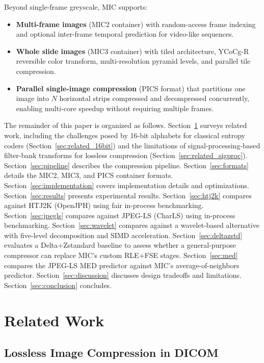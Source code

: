 \documentclass[11pt,twocolumn]{article}
\begin{document}
Beyond single-frame greyscale, MIC supports:
\begin{itemize}[nosep]
    \item \textbf{Multi-frame images} (MIC2 container) with random-access frame indexing and optional inter-frame temporal prediction for video-like sequences.
    \item \textbf{Whole slide images} (MIC3 container) with tiled architecture, YCoCg-R reversible color transform, multi-resolution pyramid levels, and parallel tile compression.
    \item \textbf{Parallel single-image compression} (PICS format) that partitions one image into $N$ horizontal strips compressed and decompressed concurrently, enabling multi-core speedup without requiring multiple frames.
\end{itemize}

The remainder of this paper is organized as follows.
Section~\ref{sec:related} surveys related work, including the challenges posed by 16-bit alphabets for classical entropy coders (Section~\ref{sec:related_16bit}) and the limitations of signal-processing-based filter-bank transforms for lossless compression (Section~\ref{sec:related_sigproc}).
Section~\ref{sec:pipeline} describes the compression pipeline.
Section~\ref{sec:formats} details the MIC2, MIC3, and PICS container formats.
Section~\ref{sec:implementation} covers implementation details and optimizations.
Section~\ref{sec:results} presents experimental results.
Section~\ref{sec:htj2k} compares against HTJ2K (OpenJPH) using fair in-process benchmarking.
Section~\ref{sec:jpegls} compares against JPEG-LS (CharLS) using in-process benchmarking.
Section~\ref{sec:wavelet} compares against a wavelet-based alternative with five-level decomposition and SIMD acceleration.
Section~\ref{sec:deltazstd} evaluates a Delta+Zstandard baseline to assess whether a general-purpose compressor can replace MIC's custom RLE+FSE stages.
Section~\ref{sec:med} compares the JPEG-LS MED predictor against MIC's average-of-neighbors predictor.
Section~\ref{sec:discussion} discusses design tradeoffs and limitations.
Section~\ref{sec:conclusion} concludes.

\section{Related Work}
\label{sec:related}

\subsection{Lossless Image Compression in DICOM}
\end{document}
